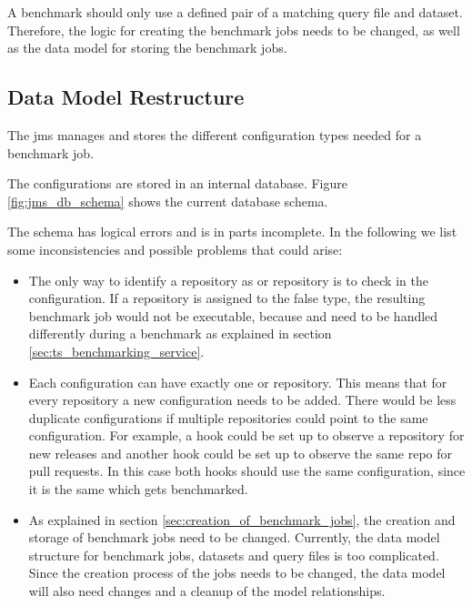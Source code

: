 A benchmark should only use a defined pair of a matching query file and dataset.
Therefore, the logic for creating the benchmark jobs needs to be changed, as well as the data model for storing the benchmark jobs.


\subsection{Data Model Restructure}
\label{sec:review_data_model}
The \ac{jms} manages and stores the different configuration types needed for a benchmark job.

The configurations are stored in an internal database.
Figure \ref{fig:jms_db_schema} shows the current database schema.

The schema has logical errors and is in parts incomplete.
In the following we list some inconsistencies and possible problems that could arise:
\begin{itemize}
	\item The only way to identify a repository as \gh{} or \dockh{} repository is to check in the \ts{} configuration.
		If a repository is assigned to the false type, the resulting benchmark job would not be executable, because \gh{} and \dockh{} need to be handled differently during a benchmark as explained in section \ref{sec:ts_benchmarking_service}.
	
	\item Each \ts{} configuration can have exactly one \gh{} or \dockh{} repository.
		This means that for every repository a new \ts{} configuration needs to be added.
		There would be less duplicate configurations if multiple repositories could point to the same configuration.
		For example, a hook could be set up to observe a \gh{} repository for new releases and another hook could be set up to observe the same \gh{} repo for pull requests.
		In this case both hooks should use the same \ts{} configuration, since it is the same \ts{} which gets benchmarked.
		
	\item As explained in section \ref{sec:creation_of_benchmark_jobs}, the creation and storage of benchmark jobs need to be changed.
		Currently, the data model structure for benchmark jobs, datasets and query files is too complicated.
		Since the creation process of the jobs needs to be changed, the data model will also need changes and a cleanup of the model relationships.
	
\end{itemize} 

